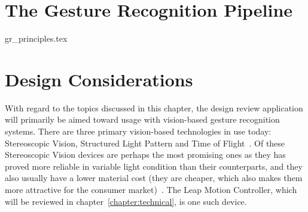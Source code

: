 \section{The Gesture Recognition Pipeline}
\label{sec:gr_principles}
{gr_principles.tex}


\section{Design Considerations}
With regard to the topics discussed in this chapter, the design review application will primarily be aimed toward usage with vision-based gesture recognition
systems. There are three primary vision-based technologies in use today: Stereoscopic Vision, Structured Light Pattern and Time of Flight~\citep{Ko2012}.
Of these Stereoscopic Vision devices are perhaps the most promising ones as they has proved more reliable in variable light condition than their counterparts, and they 
also usually have a lower material cost (they are cheaper, which also makes them more attractive for the consumer market)~\citep{Ko2012}. 
The Leap Motion Controller, which will be reviewed in chapter~\ref{chapter:technical}, is one such device. 
 



